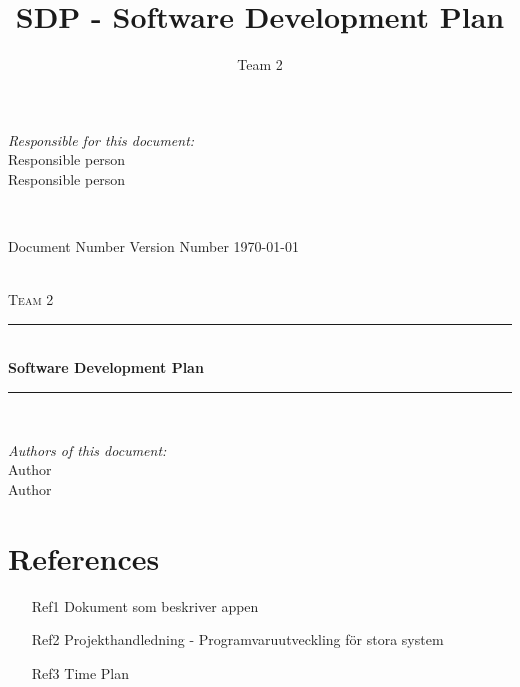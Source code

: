\documentclass[a4paper]{article}
\title{SDP - Software Development Plan}
\author{Team 2}
\begin{document}
\begin{titlepage}
\newcommand{\HRule}{\rule{\linewidth}{0.5mm}}

\begin{minipage}{0.5\textwidth}
\begin{flushleft} %
\textit{Responsible for this document:}\\
Responsible person \\
Responsible person
\end{flushleft}
\end{minipage}
~
\begin{minipage}{0.4\textwidth}
\begin{flushright}
Document Number Version Number
\today
\end{flushright}
\end{minipage}\\[3cm]

\centering
\textsc{\LARGE Team 2}\\[0.5cm]

\HRule \\[0.4cm]
{ \huge \bfseries Software Development Plan}\\[0.4cm] %
\HRule \\[1.5cm]

\vfill
\begin{flushleft}
\textit{Authors of this document:}\\
Author \\
Author
\end{flushleft}



\end{titlepage}
\setcounter{tocdepth}{2}
\tableofcontents
\newpage
{}

\section{References}
\begin{itemize}
\item[Ref1] Dokument som beskriver appen
\item[Ref2] Projekthandledning - Programvaruutveckling för stora system
\item[Ref3] Time Plan
\end{itemize}
\end{document}
